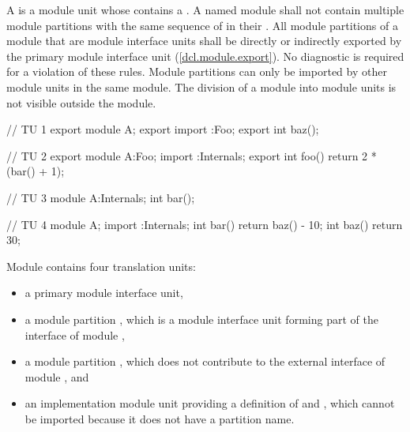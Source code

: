 \begin{std.txt}
\begin{after}\color{addclr}
\alinea
A  is
a module unit whose  contains
a .
A named module shall not contain multiple module partitions with
the same sequence of  in their
.
All module partitions of a module
that are module interface units
shall be directly or indirectly exported
by the primary module interface unit (\ref{dcl.module.export}).
No diagnostic is required for a violation of these rules.
\enternote
Module partitions can only be imported by
other module units in the same module.
The division of a module into module units
is not visible outside the module.
\exitnote
\end{after}

\begin{after}\color{addclr}
\alinea
\begin{example}
\begin{codeblock}
// TU 1
export module A;
export import :Foo;
export int baz();
\end{codeblock}

\begin{codeblock}
// TU 2
export module A:Foo;
import :Internals;
export int foo() { return 2 * (bar() + 1); }
\end{codeblock}

\begin{codeblock}
// TU 3
module A:Internals;
int bar();
\end{codeblock}

\begin{codeblock}
// TU 4
module A;
import :Internals;
int bar() { return baz() - 10; }
int baz() { return 30; }
\end{codeblock}

Module  contains four translation units:
\begin{itemize}
\item a primary module interface unit,
\item a module partition , which is a module interface unit
forming part of the interface of module ,
\item a module partition , which does not contribute
to the external interface of module , and
\item an implementation module unit providing
a definition of  and ,
which cannot be imported because
it does not have a partition name.
\end{itemize}
\end{example}
\end{after}


\end{std.txt}
